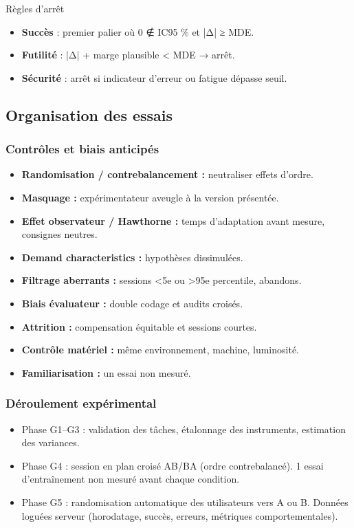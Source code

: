 \documentclass[a4paper,12pt]{article}
\begin{document}
Règles d’arrêt
\begin{itemize}
\item \textbf{Succès} : premier palier où 0 ∉ IC95 \% et |Δ| ≥ MDE.
\item \textbf{Futilité} : |Δ| + marge plausible < MDE → arrêt.
\item \textbf{Sécurité} : arrêt si indicateur d’erreur ou fatigue dépasse seuil.
\end{itemize}
\subsection{Organisation des essais}
\label{sec:org2495de2}
\subsubsection{Contrôles et biais anticipés}
\label{sec:org8316ff8}
\begin{itemize}
\item \textbf{Randomisation / contrebalancement :} neutraliser effets d’ordre.
\item \textbf{Masquage :} expérimentateur aveugle à la version présentée.
\item \textbf{Effet observateur / Hawthorne :} temps d’adaptation avant mesure, consignes neutres.
\item \textbf{Demand characteristics :} hypothèses dissimulées.
\item \textbf{Filtrage aberrants :} sessions <5e ou >95e percentile, abandons.
\item \textbf{Biais évaluateur :} double codage et audits croisés.
\item \textbf{Attrition :} compensation équitable et sessions courtes.
\item \textbf{Contrôle matériel :} même environnement, machine, luminosité.
\item \textbf{Familiarisation :} un essai non mesuré.
\end{itemize}
\subsubsection{Déroulement expérimental}
\label{sec:org2a32277}
\begin{itemize}
\item Phase G1–G3 : validation des tâches, étalonnage des instruments, estimation des variances.
\item Phase G4 : session en plan croisé AB/BA (ordre contrebalancé).  
1 essai d’entraînement non mesuré avant chaque condition.
\item Phase G5 : randomisation automatique des utilisateurs vers A ou B.  
Données loguées serveur (horodatage, succès, erreurs, métriques comportementales).
\end{itemize}
\end{document}
